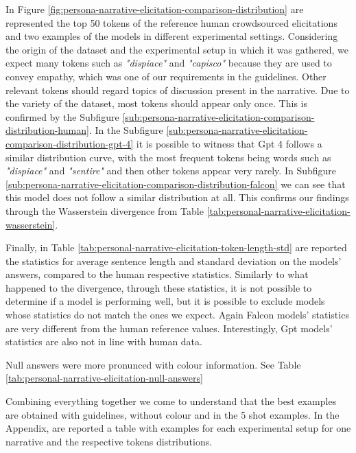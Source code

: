 In Figure \ref{fig:persona-narrative-elicitation-comparison-distribution} are represented the top 50 tokens of the reference human crowdsourced elicitations and two examples of the models in different experimental settings. Considering the origin of the dataset and the experimental setup in which it was gathered, we expect many tokens such as \emph{"dispiace"} and \emph{"capisco"} because they are used to convey empathy, which was one of our requirements in the guidelines. Other relevant tokens should regard topics of discussion present in the narrative. Due to the variety of the dataset, most tokens should appear only once. This is confirmed by the Subfigure \ref{sub:persona-narrative-elicitation-comparison-distribution-human}. 
In the Subfigure \ref{sub:persona-narrative-elicitation-comparison-distribution-gpt-4} it is possible to witness that Gpt 4 follows a similar distribution curve, with the most frequent tokens being words such as \emph{"dispiace"} and \emph{"sentire"} and then other tokens appear very rarely. 
In Subfigure \ref{sub:persona-narrative-elicitation-comparison-distribution-falcon} we can see that this model does not follow a similar distribution at all. This confirms our findings through the Wasserstein divergence from Table \ref{tab:personal-narrative-elicitation-wasserstein}.

% 
Finally, in Table \ref{tab:personal-narrative-elicitation-token-length-std} are reported the statistics for average sentence length and standard deviation on the models' answers, compared to the human respective statistics. Similarly to what happened to the divergence, through these statistics, it is not possible to determine if a model is performing well, but it is possible to exclude models whose statistics do not match the ones we expect. Again Falcon models' statistics are very different from the human reference values. Interestingly, Gpt models' statistics are also not in line with human data. 


Null answers were more pronunced with colour information. See Table \ref{tab:personal-narrative-elicitation-null-answers}

Combining everything together we come to understand that the best examples are obtained with guidelines, without colour and in the 5 shot examples. In the Appendix, are reported a table with examples for each experimental setup for one narrative and the respective tokens distributions.